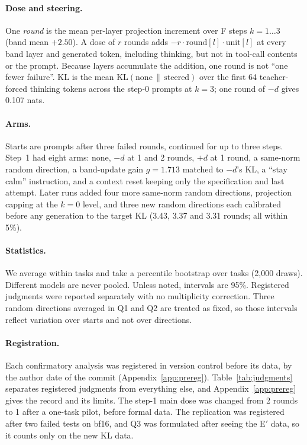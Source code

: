 \documentclass[11pt]{article}
\newcommand{\mind}{$-d$}
\newcommand{\plusd}{$+d$}
\begin{document}
\paragraph{Dose and steering.} One \emph{round} is the mean per-layer projection increment over F steps $k=1\ldots3$ (band mean $+2.50$). A dose of $r$ rounds adds $-r\cdot\text{round}[l]\cdot\text{unit}[l]$ at every band layer and generated token, including thinking, but not in tool-call contents or the prompt. Because layers accumulate the addition, one round is not ``one fewer failure''. KL is the mean $\mathrm{KL}(\text{none}\,\|\,\text{steered})$ over the first 64 teacher-forced thinking tokens across the step-0 prompts at $k=3$; one round of \mind{} gives 0.107 nats.

\paragraph{Arms.} Starts are prompts after three failed rounds, continued for up to three steps. Step~1 had eight arms: none, \mind{} at 1 and 2 rounds, \plusd{} at 1 round, a same-norm random direction, a band-update gain $g=1.713$ matched to \mind{}'s KL, a ``stay calm'' instruction, and a context reset keeping only the specification and last attempt. Later runs added four more same-norm random directions, projection capping at the $k=0$ level, and three new random directions each calibrated before any generation to the target KL (3.43, 3.37 and 3.31 rounds; all within 5\%).

\paragraph{Statistics.} We average within tasks and take a percentile bootstrap over tasks (2,000 draws). Different models are never pooled. Unless noted, intervals are 95\%. Registered judgments were reported separately with no multiplicity correction. Three random directions averaged in Q1 and Q2 are treated as fixed, so those intervals reflect variation over starts and not over directions.

\paragraph{Registration.} Each confirmatory analysis was registered in version control before its data, by the author date of the commit (Appendix~\ref{app:prereg}). Table~\ref{tab:judgments} separates registered judgments from everything else, and Appendix~\ref{app:prereg} gives the record and its limits. The step-1 main dose was changed from 2 rounds to 1 after a one-task pilot, before formal data. The replication was registered after two failed tests on bf16, and Q3 was formulated after seeing the E$'$ data, so it counts only on the new KL data.
\end{document}
